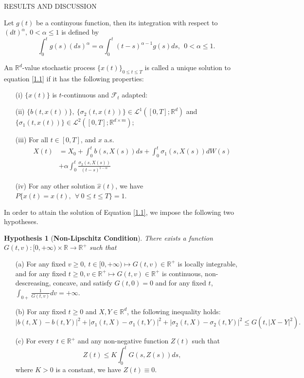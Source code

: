 \documentclass[unknownkeysallowed, compress]{beamer}
\newtheorem{hypothesis}[theorem]{\textbf{Hypothesis}}
\theoremstyle{plain}
\begin{document}
\begin{frame}[allowframebreaks]{RESULTS AND DISCUSSION}
\begin{lemma}\label{l2.1}
Let $g(t)$ be a continyous function, then its integration with respect to $(dt)^\alpha,~0<\alpha\leq 1$ is defined by
$$
\int_0^tg(s)(ds)^\alpha = \alpha\int_0^t(t-s)^{\alpha - 1}g(s)ds,~~0<\alpha\leq 1.
$$
\end{lemma}
\begin{definition}\label{d2.2}
\normalfont
An $\mathbb{R}^d$-value stochastic process $\{x(t)\}_{0\leq t\leq T}$ is called a unique solution to equation \eqref{1.1} if it has the following properties:
\end{definition}
\begin{enumerate}
\item[(i)] $\{x(t)\}$ is $t$-continuous and $\mathcal{F}_t$ adapted:
\item[(ii)] $\{b(t,x(t))\},~\{\sigma_2(t,x(t))\}\in\mathcal{L}^1([0,T];\mathbb{R}^d)$ and $\{\sigma_1(t,x(t))\}\in\mathcal{L}^2([0,T];\mathbb{R}^{d\times m})$;
\item[(iii)] For all $t\in[0,T]$, and $x$ a.s.
\begin{equation}\label{2.1}
\begin{split}
X(t) &= X_0+\int_0^tb(s,X(s))ds+\int_0^t\sigma_1(s,X(s))dW(s)\\
&+\alpha\int_0^t\frac{\sigma_2(s,X(s))}{(t-s)^{1-\alpha}}
\end{split}
\end{equation}
\item[(iv)] For any other solution $\hat{x}(t)$, we have $P\{x(t) = \hat{x}(t),~~\forall~0\leq t\leq T\} = 1.$
\end{enumerate}



In order to attain the solution of Equation \eqref{1.1}, we impose the following two hypotheses.

\begin{hypothesis}[\textbf{Non-Lipschitz Condition}]\label{hypo1}
\normalfont
There exists a function $G(t,v) : [0,+\infty)\times \mathbb{R}\rightarrow\mathbb{R}^+$ such that 
\end{hypothesis}
\begin{enumerate}
\item[(a)] For any fixed $v\geq 0,~t\in[0,+\infty)\mapsto G(t,v)\in\mathbb{R}^+$ is locally integrable, and for any fixed $t\geq 0,v\in\mathbb{R}^+\mapsto G(t,v)\in\mathbb{R}^+$ is continuous, non-descreasing, concave, and satisfy $G(t,0) = 0$ and for any fixed $t$, $\int_{0+}\frac{1}{G(t,v)}dv = +\infty.$ 
\item[(b)] For any fixed $t\geq 0$ and $X,Y\in\mathbb{R}^d$, the following inequality holds:
$$
|b(t,X) - b(t,Y)|^2 + |\sigma_1(t,X) - \sigma_1(t,Y)|^2+|\sigma_2(t,X) - \sigma_2(t,Y)|^2\leq  G(t,|X-Y|^2).
$$
\item[(c)] For every $t\in\mathbb{R}^+$ and any non-negative function $Z(t)$ such that
$$
Z(t)\leq K\int_0^t G(s,Z(s))ds,
$$
where $K>0$ is a constant, we have $Z(t)\equiv 0$.
\end{enumerate}


\end{frame}
\end{document}
